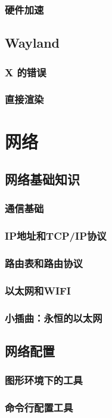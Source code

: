 \documentclass[amstex,twoside]{ctexbook}
\begin{document}
\subsection{  硬件加速	}
\section{  Wayland	}
\subsection{ X 的错误	}
\subsection{  直接渲染}

\chapter{网络}
\section{  网络基础知识}
\subsection{  通信基础}
\subsection{  IP地址和TCP/IP协议}
\subsection{  路由表和路由协议}
\subsection{ 以太网和WIFI}
\subsection*{  小插曲：永恒的以太网}

\section{网络配置\label{sec:ifconfig}}
\subsection{  图形环境下的工具	}
\subsection{ 命令行配置工具}
\end{document}

